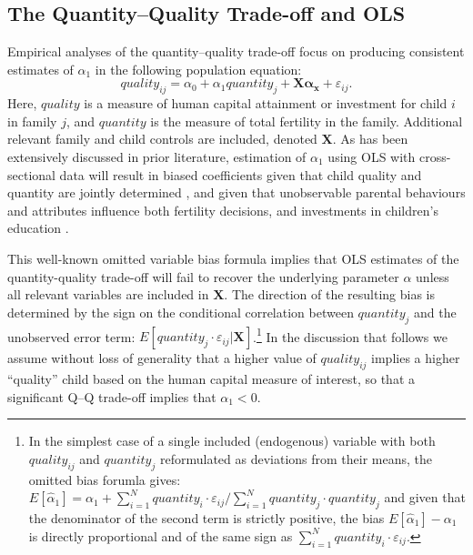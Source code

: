 \documentclass[subeqn]{article}
\begin{document}
\begin{spacing}{1.4}
\subsection{The Quantity--Quality Trade-off and OLS}
\label{sscn:OLS}
Empirical analyses of the quantity--quality trade-off focus on producing
consistent estimates of $\alpha_1$ in the following population equation:
\begin{equation}
  \label{TWINeqn:RF}
  quality_{ij}=\alpha_0+\alpha_1 quantity_{j} + \bm{X}\bm{\alpha_x}+\varepsilon_{ij}.
\end{equation}
Here, $quality$ is a measure of human capital attainment or investment for child
$i$ in family $j$, and $quantity$ is the measure of total fertility in the
family. Additional relevant family and child controls are included, denoted $\bm{X}$.
As has been extensively discussed in prior literature, estimation of $\alpha_1$
using OLS with cross-sectional data will result in biased coefficients given that
child quality and quantity are jointly determined \citep{BeckerLewis1973,
  BeckerTomes1976}, and given that unobservable parental behaviours and attributes
influence both fertility decisions, and investments in children's education
\citep{Qian2009}.

This well-known omitted variable bias formula implies that OLS estimates of
the quantity-quality trade-off will fail to recover the underlying parameter
$\alpha$ unless all relevant variables are included in $\bm{X}$. The direction
of the resulting bias is determined by the sign on the conditional correlation
between $quantity_j$ and the unobserved error term:
$E[quantity_{j}\cdot\varepsilon_{ij}|\bm{X}]$.\footnote{In the simplest case
  of a single included (endogenous) variable with both $quality_{ij}$ and
  $quantity_j$ reformulated as deviations from their means, the omitted bias
  forumla gives:
  $
  E[\hat\alpha_1]=\alpha_1+\sum_{i=1}^N quantity_i\cdot\varepsilon_{ij}/\sum_{i=1}^N quantity_j\cdot quantity_j
  $
  and given that the denominator of the second term is strictly positive, the
  bias $E[\hat\alpha_1]-\alpha_1$ is directly proportional and of the same
  sign as $\sum_{i=1}^N quantity_i\cdot\varepsilon_{ij}$.
}
In the discussion that follows we assume without loss of generality that a higher
value of $quality_{ij}$ implies a higher ``quality'' child based on the human capital
measure of interest, so that a significant Q--Q trade-off implies that $\alpha_1<0$.



\end{spacing}
\end{document}
